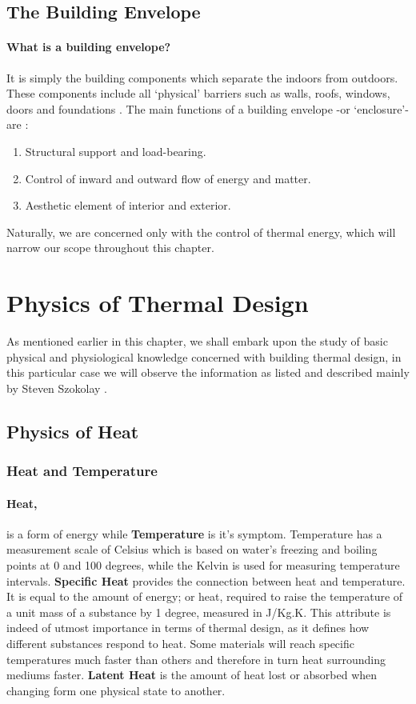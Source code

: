 \subsection{The Building Envelope}
\paragraph{What is a building envelope?}It is simply the building components which
separate the indoors from outdoors. These components include all `physical' barriers such as walls, roofs,
windows, doors and foundations \cite{HPO}. The main functions of a building envelope -or
`enclosure'- are \cite{straube05}:
\begin{enumerate}
  \item Structural support and load-bearing.
  \item Control of inward and outward flow of energy and matter.
  \item Aesthetic element of interior and exterior.
\end{enumerate}
Naturally, we are concerned only with the control of thermal energy, which will narrow our scope
throughout this chapter.
\section{Physics of Thermal Design}
As mentioned earlier in this chapter, we shall embark upon the study of basic physical and
physiological knowledge concerned with building thermal design, in this particular case we
will observe the information as listed and described mainly by Steven Szokolay \cite{szokolay08}.

\subsection{Physics of Heat}
\subsubsection{Heat and Temperature}
\paragraph{Heat,}is a form of energy while \textbf{Temperature} is it's symptom. Temperature has a
measurement scale of Celsius which is based on water's freezing and boiling points at 0 and 100
degrees, while the Kelvin is used for measuring temperature intervals. \textbf{Specific Heat}
provides the connection between heat and temperature. It is equal to the amount of energy; or heat,
required to raise the temperature of a unit mass of a substance by 1 degree, measured in J/Kg.K. This
attribute is indeed of utmost importance in terms of thermal design, as it defines how different
substances respond to heat. Some materials will reach specific temperatures much faster than others
and therefore in turn heat surrounding mediums faster. \textbf{Latent Heat} is the amount of heat
lost or absorbed when changing form one physical state to another.

